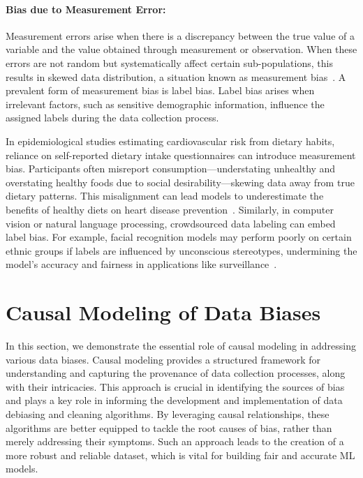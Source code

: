 \documentclass[11pt]{article}
\begin{document}
\vspace{-.3cm}
\paragraph{Bias due to Measurement Error:} 
Measurement errors arise when there is a discrepancy between the true value of a variable and the value obtained through measurement or observation. When these errors are not random but systematically affect certain sub-populations, this results in skewed data distribution, a situation known as measurement bias~\cite{pearl2012measurement,kuroki2014measurement,millsap1993methodology}.
A prevalent form of measurement bias is label bias. Label bias arises when irrelevant factors, such as sensitive demographic information, influence the assigned labels during the data collection process.

\begin{example}
In epidemiological studies estimating cardiovascular risk from dietary habits, reliance on self-reported dietary intake questionnaires can introduce measurement bias. Participants often misreport consumption—understating unhealthy and overstating healthy foods due to social desirability—skewing data away from true dietary patterns. This misalignment can lead models to underestimate the benefits of healthy diets on heart disease prevention~\cite{Page2008Appraising}. Similarly, in computer vision or natural language processing, crowdsourced data labeling can embed label bias. For example, facial recognition models may perform poorly on certain ethnic groups if labels are influenced by unconscious stereotypes, undermining the model's accuracy and fairness in applications like surveillance~\cite{haliburton2023investigating}.
\end{example}


\section{Causal Modeling of Data Biases}\label{section:causalmodeling}

In this section, we demonstrate the essential role of causal modeling in addressing various data biases. Causal modeling provides a structured framework for understanding and capturing the provenance of data collection processes, along with their intricacies. This approach is crucial in identifying the sources of bias and plays a key role in informing the development and implementation of data debiasing and cleaning algorithms. By leveraging causal relationships, these algorithms are better equipped to tackle the root causes of bias, rather than merely addressing their symptoms. Such an approach leads to the creation of a more robust and reliable dataset, which is vital for building fair and accurate ML models.
\vspace{-.3cm}
\end{document}
